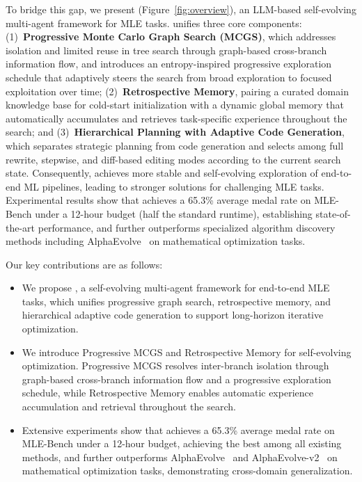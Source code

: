 To bridge this gap, we present \textbf{\sname} (Figure~\ref{fig:overview}), an LLM-based self-evolving multi-agent framework for MLE tasks. \sname unifies three core components: (1)~\textbf{Progressive Monte Carlo Graph Search (MCGS)}, which addresses isolation and limited reuse in tree search through graph-based cross-branch information flow, and introduces an entropy-inspired progressive exploration schedule that adaptively steers the search from broad exploration to focused exploitation over time; (2)~\textbf{Retrospective Memory}, pairing a curated domain knowledge base for cold-start initialization with a dynamic global memory that automatically accumulates and retrieves task-specific experience throughout the search; and (3)~\textbf{Hierarchical Planning with Adaptive Code Generation}, which separates strategic planning from code generation and selects among full rewrite, stepwise, and diff-based editing modes according to the current search state.
Consequently, \sname achieves more stable and self-evolving exploration of end-to-end ML pipelines, leading to stronger solutions for challenging MLE tasks. Experimental results show that \sname achieves a 65.3\% average medal rate on MLE-Bench under a 12-hour budget (half the standard runtime), establishing state-of-the-art performance, and further outperforms specialized algorithm discovery methods including AlphaEvolve~\citep{novikov2025alphaevolve} on mathematical optimization tasks.


Our key contributions are as follows:

\begin{itemize}[leftmargin=*]
    \item We propose \sname, a self-evolving multi-agent framework for end-to-end MLE tasks, which unifies progressive graph search, retrospective memory, and hierarchical adaptive code generation to support long-horizon iterative optimization.
    
    \item We introduce Progressive MCGS and Retrospective Memory for self-evolving optimization. Progressive MCGS resolves inter-branch isolation through graph-based cross-branch information flow and a progressive exploration schedule, while Retrospective Memory enables automatic experience accumulation and retrieval throughout the search.
    
    \item Extensive experiments show that \sname achieves a 65.3\% average medal rate on MLE-Bench under a 12-hour budget, achieving the best among all existing methods, and further outperforms AlphaEvolve~\citep{novikov2025alphaevolve} and AlphaEvolve-v2~\citep{alphaevolve_v2} on mathematical optimization tasks, demonstrating cross-domain generalization.

\end{itemize}
